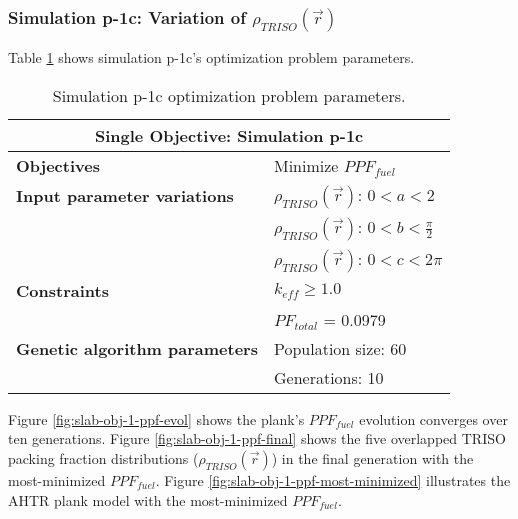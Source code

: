 \subsubsection{Simulation p-1c: Variation of $\rho_{TRISO}(\vec{r})$}
Table \ref{tab:simulationp1c} shows simulation p-1c's optimization problem parameters. 
\begin{table}[htbp!]
    \centering
    \onehalfspacing
    \caption{Simulation p-1c optimization problem parameters.}
	\label{tab:simulationp1c}
    \footnotesize
    \begin{tabular}{l|p{4cm}}
    \hline 
    \multicolumn{2}{c}{\textbf{Single Objective: Simulation p-1c}} \\
    \hline 
    \textbf{Objectives} & Minimize $PPF_{fuel}$ \\
    \hline 
    \textbf{Input parameter variations}
    & $\rho_{TRISO}(\vec{r})$: $0<a<2$ \\
    & $\rho_{TRISO}(\vec{r})$: $0<b<\frac{\pi}{2}$ \\
    & $\rho_{TRISO}(\vec{r})$: $0<c<2\pi$ \\
    \hline
    \textbf{Constraints} & $k_{eff} \geq 1.0$\\ 
    & $PF_{total}$ = 0.0979\\
    \hline 
    \textbf{Genetic algorithm parameters} & Population size: 60 \\
    & Generations: 10 \\
    \hline
    \end{tabular}
\end{table}
Figure \ref{fig:slab-obj-1-ppf-evol} shows the plank's $PPF_{fuel}$ evolution 
converges over ten generations.  
Figure \ref{fig:slab-obj-1-ppf-final} shows the five overlapped \gls{TRISO} 
packing fraction distributions ($\rho_{TRISO}(\vec{r})$) in the final generation 
with the most-minimized $PPF_{fuel}$. 
Figure \ref{fig:slab-obj-1-ppf-most-minimized} illustrates the \gls{AHTR} plank model 
with the most-minimized $PPF_{fuel}$. 
